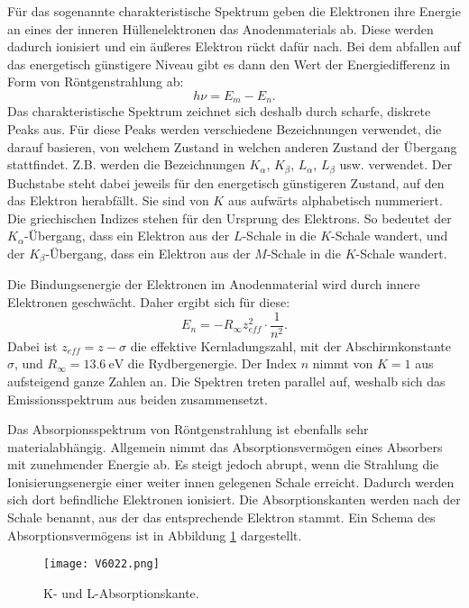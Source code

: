 \documentclass[
  bibliography=totoc,     %
  captions=tableheading,  %
  titlepage=firstiscover, %
]{scrartcl}
\begin{document}
\noindent
Für das sogenannte charakteristische Spektrum geben die Elektronen ihre Energie
an eines der inneren Hüllenelektronen das Anodenmaterials ab. Diese werden
dadurch ionisiert und ein äußeres Elektron rückt dafür nach. Bei dem abfallen
auf das energetisch günstigere Niveau gibt es dann den Wert der
Energiedifferenz in Form von Röntgenstrahlung ab:
\begin{equation}
  h \nu = E_m - E_n.
  \label{eqn:energdif}
\end{equation}
Das charakteristische Spektrum zeichnet sich deshalb durch scharfe, diskrete
Peaks aus. Für diese Peaks werden verschiedene Bezeichnungen verwendet, die
darauf basieren, von welchem Zustand in welchen anderen Zustand der Übergang
stattfindet. Z.B. werden die Bezeichnungen $K_\alpha$, $K_\beta$, $L_\alpha$,
$L_\beta$ usw. verwendet. Der Buchstabe steht dabei jeweils für den energetisch
günstigeren Zustand, auf den das Elektron herabfällt. Sie sind von $K$ aus
aufwärts alphabetisch nummeriert. Die griechischen Indizes stehen für den
Ursprung des Elektrons. So bedeutet der $K_\alpha$-Übergang, dass ein Elektron
aus der $L$-Schale in die $K$-Schale wandert, und der $K_\beta$-Übergang, dass
ein Elektron aus der $M$-Schale in die $K$-Schale wandert.

\noindent
Die Bindungsenergie der Elektronen im Anodenmaterial wird durch innere
Elektronen
geschwächt. Daher ergibt sich für diese:
\begin{equation}
  E_n = - R_\infty z_{eff}^2 \cdot \frac{1}{n^2}.
  \label{eqn:bindungsen}
\end{equation}
Dabei ist $z_{eff} = z - \sigma$ die effektive Kernladungszahl, mit der
Abschirmkonstante $\sigma$, und $R_\infty = \SI{13.6}{\electronvolt}$ die
Rydbergenergie. Der Index $n$ nimmt von $K = 1$ aus aufsteigend ganze Zahlen
an.
Die Spektren treten parallel auf, weshalb sich das Emissionsspektrum aus beiden
zusammensetzt.

\noindent
Das Absorpionsspektrum von Röntgenstrahlung ist ebenfalls sehr
materialabhängig.
Allgemein nimmt das Absorptionsvermögen eines Absorbers mit zunehmender Energie
ab. Es steigt jedoch abrupt, wenn die Strahlung die Ionisierungsenergie einer
weiter innen gelegenen Schale erreicht. Dadurch werden sich dort befindliche
Elektronen ionisiert. Die Absorptionskanten werden nach der
Schale benannt, aus der das entsprechende Elektron stammt.
Ein Schema des Absorptionsvermögens ist in Abbildung \ref{fig:V6022}
dargestellt.
\begin{figure}[htb]
  \centering
  \texttt{[image: V6022.png]}
  \caption{K- und L-Absorptionskante. \cite{anleitung}}
  \label{fig:V6022}
\end{figure}
\end{document}
